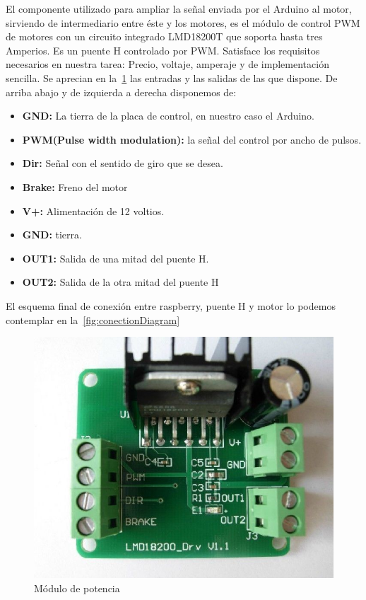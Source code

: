 
El componente utilizado para ampliar la señal enviada por el Arduino al motor, sirviendo de intermediario entre éste y los motores, es el módulo de control PWM de motores con un circuito integrado LMD18200T que soporta hasta tres Amperios. Es un puente H controlado por PWM. Satisface los requisitos necesarios en nuestra tarea: Precio, voltaje, amperaje y de implementación sencilla. Se aprecian en la~\cref{fig:Hbridge} las entradas y las salidas de las que dispone. De arriba abajo y de izquierda a derecha disponemos de:

\begin{itemize}
	\item \textbf{GND:} La tierra de la placa de control, en nuestro caso el Arduino.
	\item \textbf{PWM(Pulse width modulation):} la señal del control por ancho de pulsos.
	\item \textbf{Dir:} Señal con el sentido de giro que se desea.
	\item \textbf{Brake:} Freno del motor
	\item \textbf{V+:} Alimentación de 12 voltios.
	\item \textbf{GND:} tierra.
	\item \textbf{OUT1:} Salida de una mitad del puente H.
	\item \textbf{OUT2:} Salida de la otra mitad del puente H
\end{itemize}

El esquema final de conexión entre raspberry, puente H y motor lo podemos contemplar en la~\cref{fig:conectionDiagram}\\

\begin{figure}[H]
		\centering
		\includegraphics[scale = 0.3]{part/Proyecto_ejecutivo/memoria_constructiva/motor/img/modulopot}
		\caption{Módulo de potencia}\label{fig:Hbridge}
\end{figure}

